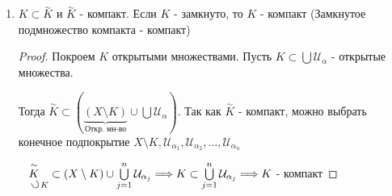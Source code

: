 \begin{theorem-non}
\begin{enumerate}
\begin{proof}
            Проверим, что дополнение $K$ открыто. Возьмем $a \notin K$ и покажем, что 
            $B_r(a) \subset X \setminus K$ для некоторого $r > 0$. Для $x \in K$ возьмем шарик $B_{\rho(x, a)/2}(x) =: \mathcal{U}_x$
            - открытое множество $\mathcal{U}_x \cap B_{\rho(x, a)/2}(a) \neq \varnothing \Longrightarrow K \subset \bigcup\limits_{x \in K} \mathcal{U}_k$.
            Так как $K$ - компакт, можно вырбрать $\mathcal{U}_{x_1}, \mathcal{U}_{x_2}, \dots, \mathcal{U}_{x_n}$, такие что $K \subset \bigcup\limits_{j = 1}^{n} \mathcal{U}_{x_j}
            \quad \mathcal{U}_{x_j} \cap B_{r_j}(a) = \varnothing, \; r_j = \rho(x_j, a)/2$. Если $r = min \ r_j$, то $\mathcal{U}_{x_j} \cap B_{r}(a) = \varnothing \Longrightarrow K \cap B_r(a) = \varnothing 
            \Longrightarrow B_r(a) \subset X \setminus K$ 

            Теперь проверим ограниченность. Возьмем $a \in X$. Тогда $K \subset \bigcup\limits_{n = 1}^{\infty} B_n(a)$.
            Если $x \in K$, то расстрояние между $x$ и $a$ будет конечным, а значит есть такой натуральный номер, который больше, 
            чем это расстояние $\Longrightarrow x \in B_n(a)$. Так как $K$ - компакт, можно выбрать конечное подпокрытие 
            $B_1(a), \dots, B_n(a) \qquad K \subset \bigcup\limits_{j = 1}^{n} B_j(a) = B_n(a) \Longrightarrow K$ содержится в каком то шаре $\Longrightarrow K$ - ограниченное множество 
        \end{proof}
        \item $K \subset \overset{\mathtt{\sim}}{K}$ и $\overset{\mathtt{\sim}}{K}$ - компакт. Если $K$ - замкнуто, то $K$ - компакт
        (Замкнутое подмножество компакта - компакт)
        \begin{proof} \quad

            Покроем $K$ открытыми множествами. Пусть $K \subset \bigcup \mathcal{U}_{\alpha}$ - открытые множества. 
            
            Тогда $\overset{\mathtt{\sim}}{K} \subset (\underbrace{(X \setminus K)}_{\text{Откр. мн-во}} \cup \bigcup \mathcal{U}_{\alpha})$.
            Так как $\overset{\mathtt{\sim}}{K}$ - компакт, можно выбрать конечное подпокрытие $X \setminus K, \mathcal{U}_{\alpha_1}, \mathcal{U}_{\alpha_2}, \dots, \mathcal{U}_{\alpha_n}$

            $\underset{\quad \rotatebox[origin=c]{120}{$ \subset $} K}{\overset{\mathtt{\sim}}{K}} \subset (X \setminus K) \cup \bigcup\limits_{j = 1}^{n} \mathcal{U}_{\alpha_j} \Longrightarrow K \subset \bigcup\limits_{j = 1}^{n} \mathcal{U}_{\alpha_j} \Longrightarrow K$ - компакт
            
        \end{proof}
    \end{enumerate}
\end{theorem-non}

